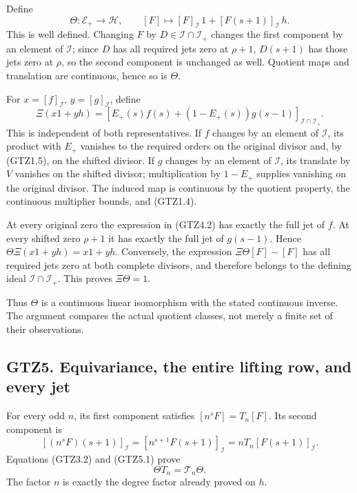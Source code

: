 Define \[
\boxed{\Theta:\mathcal E_+\longrightarrow\mathcal H,\qquad
[F]\longmapsto [F]_{\mathcal I}\,1+[F(s+1)]_{\mathcal I}\,h.}
\tag{GTZ4.1}
\] This is well defined. Changing \(F\) by
\(D\in\mathcal I\cap\mathcal I_+\) changes the first component by an
element of \(\mathcal I\); since \(D\) has all required jets zero at
\(\rho+1\), \(D(s+1)\) has those jets zero at \(\rho\), so the second
component is unchanged as well. Quotient maps and translation are
continuous, hence so is \(\Theta\).

For \(x=[f]_{\mathcal I}\), \(y=[g]_{\mathcal I}\), define \[
\boxed{\Xi(x1+yh)=
[E_+(s)f(s)+(1-E_+(s))g(s-1)]_{\mathcal I\cap\mathcal I_+}.}
\tag{GTZ4.2}
\] This is independent of both representatives. If \(f\) changes by an
element of \(\mathcal I\), its product with \(E_+\) vanishes to the
required orders on the original divisor and, by (GTZ1.5), on the shifted
divisor. If \(g\) changes by an element of \(\mathcal I\), its translate
by \(V\) vanishes on the shifted divisor; multiplication by \(1-E_+\)
supplies vanishing on the original divisor. The induced map is
continuous by the quotient property, the continuous multiplier bounds,
and (GTZ1.4).

At every original zero the expression in (GTZ4.2) has exactly the full
jet of \(f\). At every shifted zero \(\rho+1\) it has exactly the full
jet of \(g(s-1)\). Hence \(\Theta\Xi(x1+yh)=x1+yh\). Conversely, the
expression \(\Xi\Theta[F]-[F]\) has all required jets zero at both
complete divisors, and therefore belongs to the defining ideal
\(\mathcal I\cap\mathcal I_+\). This proves \(\Xi\Theta=1\).

Thus \(\Theta\) is a continuous linear isomorphism with the stated
continuous inverse. The argument compares the actual quotient classes,
not merely a finite set of their observations.

\subsection{GTZ5. Equivariance, the entire lifting row, and every
jet}\label{gtz5.-equivariance-the-entire-lifting-row-and-every-jet}

For every odd \(n\), its first component satisfies \([n^sF]=T_n[F]\).
Its second component is \[
[(n^sF)(s+1)]_{\mathcal I}
=[n^{s+1}F(s+1)]_{\mathcal I}
=nT_n[F(s+1)]_{\mathcal I}.
\tag{GTZ5.1}
\] Equations (GTZ3.2) and (GTZ5.1) prove \[
\Theta T_n=\mathcal T_n\Theta.
\tag{GTZ5.2}
\] The factor \(n\) is exactly the degree factor already proved on
\(h\).


